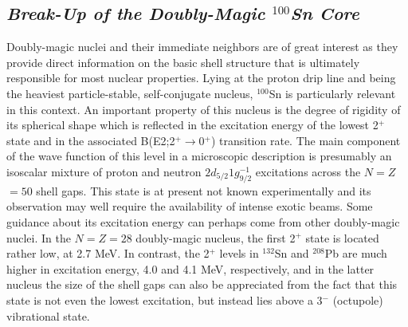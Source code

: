 \documentclass{article}
\begin{document}
\subsection{\it Break-Up of the Doubly-Magic $^{100}$Sn Core}

Doubly-magic nuclei and their immediate neighbors are of great interest
as they provide direct information on the basic shell structure that is
ultimately responsible for most nuclear properties. Lying at the proton
drip line and being
the heaviest particle-stable, self-conjugate nucleus, 
$^{100}$Sn is particularly relevant in this context.
An important property of this nucleus is the degree of rigidity of its 
spherical shape which is reflected in the excitation energy 
of the lowest 2$^+$ state and in the associated B(E2;2$^+\rightarrow$0$^+$)
transition rate. 
The main component of the wave function of 
this level in a microscopic description is presumably
an isoscalar mixture of proton and 
neutron $2d_{5/2} 1g_{9/2}^{-1}$ excitations across the $N$$=$$Z$$=$$50$ shell 
gaps. This state is at present 
not known experimentally and its observation may well require 
the availability of intense exotic beams. 
Some guidance about its excitation energy can perhaps come from other
doubly-magic nuclei. In the $N$$=$$Z=$$28$ doubly-magic nucleus,
the first 2$^+$ state is located rather low, at 2.7 MeV. In contrast,
the 2$^+$ levels in $^{132}$Sn and $^{208}$Pb are much higher in 
excitation energy, 4.0 and 4.1 MeV, respectively, and in the 
latter nucleus the size of the shell gaps can also be appreciated from
the fact that this state is not even the lowest excitation, but instead
lies above a 3$^-$ (octupole) vibrational state.
\end{document}
